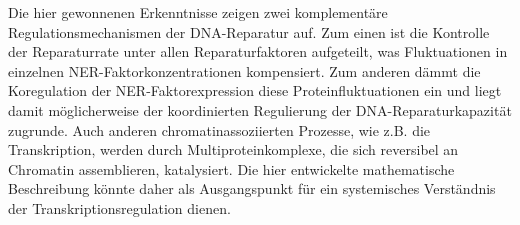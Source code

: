 Die hier gewonnenen Erkenntnisse zeigen zwei komplement\"{a}re Regulationsmechanismen der DNA-Reparatur auf. Zum einen ist die Kontrolle der Reparaturrate unter allen Reparaturfaktoren aufgeteilt, was Fluktuationen in einzelnen NER-Faktorkonzentrationen kompensiert. Zum anderen d\"{a}mmt die Koregulation der NER-Faktorexpression diese Proteinfluktuationen ein und liegt damit m\"{o}glicherweise der koordinierten Regulierung der DNA-Reparaturkapazit\"{a}t zugrunde. Auch anderen chromatinassoziierten Prozesse, wie z.B. die Transkription, werden durch Multiproteinkomplexe, die sich reversibel an Chromatin assemblieren, katalysiert. Die hier entwickelte mathematische Beschreibung k\"{o}nnte daher als Ausgangspunkt f\"{u}r ein systemisches Verst\"{a}ndnis der Transkriptionsregulation dienen.




  




